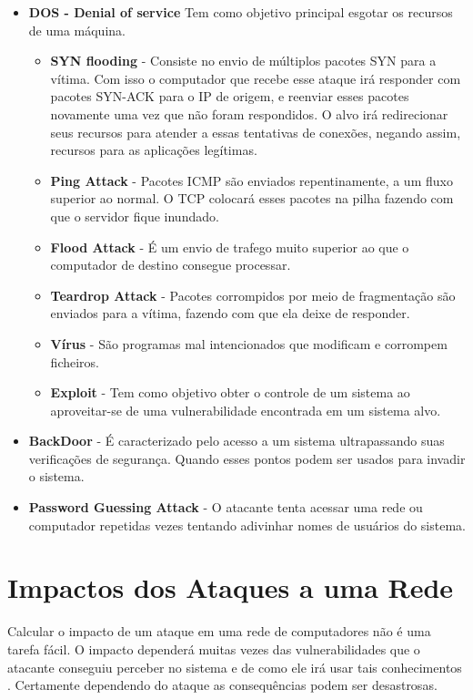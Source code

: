 		\begin{itemize}
			\item  \textbf{DOS - Denial of service} Tem  como objetivo principal esgotar os recursos de uma máquina.
				\begin{itemize}
					\item \textbf{SYN flooding} - Consiste no envio de múltiplos pacotes SYN para a vítima. Com isso o computador que recebe esse ataque irá responder com pacotes SYN-ACK para o IP de origem, e reenviar esses pacotes novamente uma vez que não foram respondidos. O alvo irá redirecionar seus recursos para atender a essas tentativas de conexões, negando assim, recursos para as aplicações legítimas.  
					\item \textbf{Ping Attack} - Pacotes ICMP são enviados repentinamente, a um fluxo superior ao normal. O TCP colocará esses pacotes na pilha fazendo com que o servidor fique inundado.
					\item \textbf{Flood Attack} - É um envio de trafego muito superior ao que o computador de destino consegue processar.
					\item \textbf{Teardrop Attack} - Pacotes corrompidos por meio de fragmentação são enviados para a vítima, fazendo com que ela deixe de responder.
					\item \textbf{Vírus} - São programas mal intencionados que modificam e corrompem ficheiros.
					\item \textbf{Exploit} - Tem como objetivo obter o controle de um sistema ao aproveitar-se de uma vulnerabilidade encontrada em um sistema alvo.
				\end{itemize}

			\item \textbf{BackDoor} - É caracterizado pelo acesso a um sistema ultrapassando suas verificações de segurança. Quando esses pontos podem ser usados para invadir o sistema.
			\item \textbf{Password Guessing Attack} - O atacante tenta acessar uma rede ou computador repetidas vezes tentando adivinhar nomes de usuários do sistema.
		\end{itemize}


	\section{Impactos dos Ataques a uma Rede}
	\label{sec:Seguranca_Impactos}

		Calcular o impacto de um ataque em uma rede de computadores não é uma tarefa fácil. O impacto dependerá muitas vezes das vulnerabilidades que o atacante conseguiu perceber no sistema e de como ele irá usar tais conhecimentos \cite{cyberAttacks}. Certamente dependendo do ataque as consequências podem ser desastrosas. 

